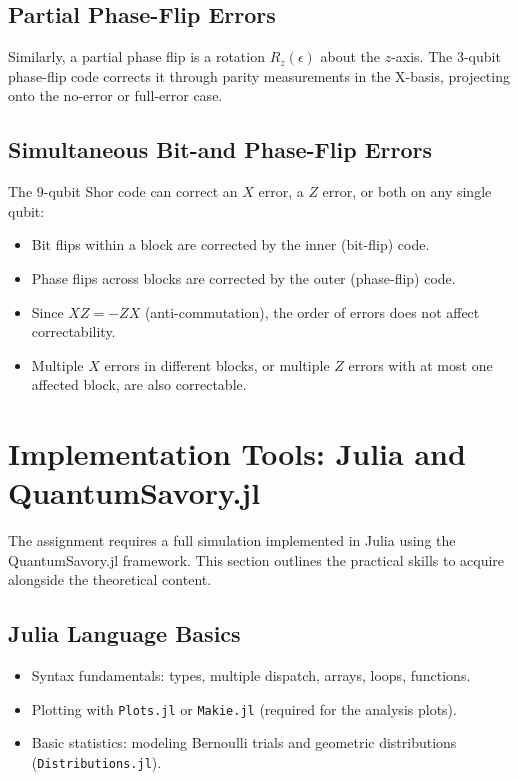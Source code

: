 \documentclass[10pt,a4paper]{article}
\begin{document}
\subsection{Partial Phase-Flip Errors}

Similarly, a partial phase flip is a rotation $R_z(\epsilon)$ about the $z$-axis. The 3-qubit phase-flip code corrects it through parity measurements in the X-basis, projecting onto the no-error or full-error case.

\subsection{Simultaneous Bit-and Phase-Flip Errors}

The 9-qubit Shor code can correct an $X$ error, a $Z$ error, or both on any single qubit:
\begin{itemize}[nosep]
\item Bit flips within a block are corrected by the inner (bit-flip) code.
\item Phase flips across blocks are corrected by the outer (phase-flip) code.
\item Since $XZ=-ZX$ (anti-commutation), the order of errors does not affect correctability.
\item Multiple $X$ errors in different blocks, or multiple $Z$ errors with at most one affected block, are also correctable.
\end{itemize}

\section{Implementation Tools: Julia and QuantumSavory.jl}

The assignment requires a full simulation implemented in Julia using the QuantumSavory.jl framework. This section outlines the practical skills to acquire alongside the theoretical content.

\subsection{Julia Language Basics}

\begin{itemize}[nosep]
\item Syntax fundamentals: types, multiple dispatch, arrays, loops, functions.
\item Plotting with \texttt{Plots.jl} or \texttt{Makie.jl} (required for the analysis plots).
\item Basic statistics: modeling Bernoulli trials and geometric distributions (\texttt{Distributions.jl}).
\end{itemize}
\end{document}

